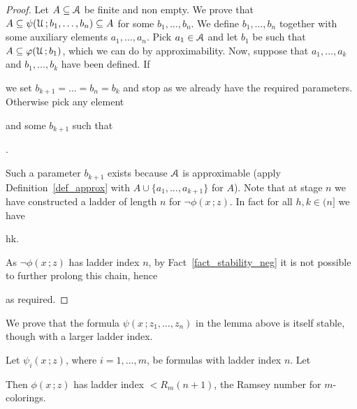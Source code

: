 \documentclass[scombinatorics.tex]{subfiles}
\begin{document}
\begin{proof}
  Let $A\subseteq\EuScript A$ be finite and non empty.
  We prove that $A\subseteq\psi(\EuScript U\,;b_1,\dots,b_n)\subseteq A$ for some $b_1,\dots,b_n$.
  We define $b_1,\dots,b_n$  together with some auxiliary
  elements $a_1,\dots,a_n$.
  Pick $a_1\in\EuScript A$ and let $b_1$ be such that $A\subseteq\varphi(\EuScript U\,;b_1)$, which we can do by approximability.
  Now, suppose that $a_1,\dots,a_k$ and $b_1,\dots,b_k$ have been defined.
  If 


  we set $b_{k+1}=\dots=b_n=b_k$ and stop as we already have the required parameters.
  Otherwise pick any element


  and some $b_{k+1}$ such that

  .

  Such a parameter $b_{k+1}$ exists because $\EuScript A$ is approximable (apply Definition~\ref{def_approx} with $A\cup\{a_1,\dots,a_{k+1}\}$ for $A$).
  Note that at stage $n$ we have constructed a ladder of length $n$ for $\neg\phi(x\,;z)$.
  In fact for all $h,k\in(n]$ we have
  
  {\IFF}
  {h\le k.}
  
  As $\neg\phi(x\,;z)$ has ladder index $n$, by Fact~\ref{fact_stability_neg} it is not possible to further prolong this chain, hence


  as required.
\end{proof}

We prove that the formula $\psi(x\,;z_1,\dots,z_n)$ in the lemma above is itself stable, though with a larger ladder index.
  
\begin{lemma}\label{lem_due}
  Let $\psi_i(x\,;z)$, where $i=1,\dots,m$, be formulas with ladder index $n$. Let
  
  
  Then $\phi(x\,;z)$ has ladder index $<R_m(n+1)$, the Ramsey number for $m$-colorings.
\end{lemma}
  
\end{document}
